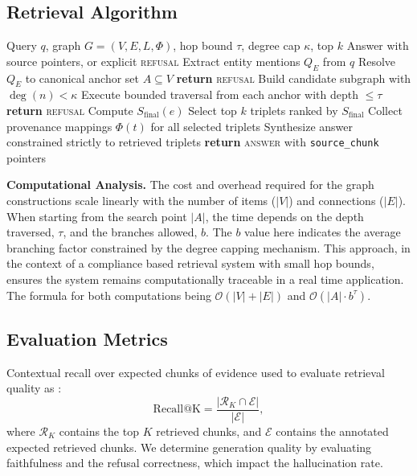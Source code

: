 \documentclass[conference]{IEEEtran}
\begin{document}
\subsection{Retrieval Algorithm}
\begin{algorithm}[htbp]
  \caption{Deterministic Lexical-Structural Fusion and Retrieval}
  \label{alg:deterministic_retrieval}
  \begin{algorithmic}[1]
    \REQUIRE Query $q$, graph $G = (V, E, L, \Phi)$, hop bound $\tau$, degree cap $\kappa$, top $k$
    \ENSURE Answer with source pointers, or explicit \textsc{refusal}
    \STATE Extract entity mentions $Q_E$ from $q$
    \STATE Resolve $Q_E$ to canonical anchor set $A \subseteq V$
      \STATE \textbf{return} \textsc{refusal}
    \ENDIF
    \STATE Build candidate subgraph with $\deg(n) < \kappa$
    \STATE Execute bounded traversal from each anchor with depth $\leq \tau$
      \STATE \textbf{return} \textsc{refusal}
    \ENDIF
      \STATE Compute $S_{\mathrm{final}}(e)$
    \ENDFOR
    \STATE Select top $k$ triplets ranked by $S_{\mathrm{final}}$
    \STATE Collect provenance mappings $\Phi(t)$ for all selected triplets
    \STATE Synthesize answer constrained strictly to retrieved triplets
    \STATE \textbf{return} \textsc{answer} with \texttt{source\_chunk} pointers
  \end{algorithmic}
\end{algorithm}

\noindent\textbf{Computational Analysis.}
The cost and overhead required for the graph constructions scale linearly with the number of items ($|V|$) and connections ($|E|$). When starting from the search point $|A|$, the time depends on the depth traversed, $\tau$, and the branches allowed, $b$. The $b$ value here indicates the average branching factor constrained by the degree capping mechanism. This approach, in the context of a compliance based retrieval system with small hop bounds, ensures the system remains computationally traceable in a real time application. The formula for both computations being $\mathcal{O}(|V| + |E|)$ and $\mathcal{O}(|A| \cdot b^{\tau})$.

\subsection{Evaluation Metrics}
Contextual recall over expected chunks of evidence used to evaluate retrieval quality as \cite{msmarco2016,trec2020}:
\begin{equation}
  \mathrm{Recall@K} = \frac{|\mathcal{R}_K \cap \mathcal{E}|}{|\mathcal{E}|},
\end{equation}
where $\mathcal{R}_K$ contains the top $K$ retrieved chunks, and $\mathcal{E}$ contains the annotated expected retrieved chunks. We determine generation quality by evaluating faithfulness and the refusal correctness, which impact the hallucination rate.
\end{document}
